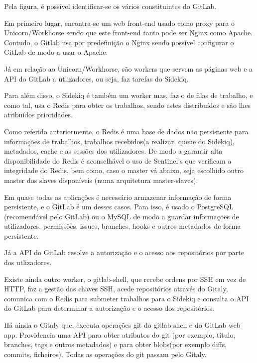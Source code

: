 \documentclass{article}
\begin{document}
Pela figura, é possível identificar-se os vários constituintes do GitLab.~\cite{arch}

Em primeiro lugar, encontra-se um web front-end usado como proxy para o Unicorn/Workhorse sendo que este front-end tanto pode ser Nginx como Apache. Contudo, o Gitlab usa por predefinição o Nginx sendo possível configurar o GitLab de modo a usar o Apache.~\cite{apache} 

Já em relação ao Unicorn/Workhorse, são workers que servem as páginas web e a API do GitLab a utlizadores, ou seja, faz tarefas do Sidekiq.

Para além disso, o Sidekiq é também um worker mas, faz o  de filas de trabalho, e como tal, usa o Redis para obter os trabalhos, sendo estes distribuídos e são lhes atribuídos prioridades.

Como referido anteriormente, o Redis é uma base de dados não persistente para informações de trabalhos, trabalhos recebidos(a realizar, queue do Sidekiq), metadados, cache e as sessões dos utilizadores. De modo a garantir alta disponibilidade do Redis é aconselhável o uso de Sentinel's que verificam a integridade do Redis, bem como, caso o master vá abaixo, seja escolhido outro master dos slaves disponíveis (numa arquitetura master-slaves).

Em quase todas as aplicações é necessário armazenar informação de forma persistente, e o GitLab é um desses casos. Para isso, é usado o PostgreSQL (recomendável pelo GitLab) ou o MySQL de modo a guardar informações de utilizadores, permissões, issues, branches, hooks e outros metadados de forma persistente.

Já a API do GitLab resolve a autorização e o acesso aos repositórios por parte dos utlizadores.

Existe ainda outro worker, o gitlab-shell, que recebe ordens por SSH em vez de HTTP, faz a gestão das chaves SSH, acede repositórios através do Gitaly, comunica com o Redis para submeter trabalhos para o Sidekiq e consulta o API do GitLab para determinar a autorização e o acesso dos repositórios.

Há ainda o Gitaly que, executa operações git do gitlab-shell e do GitLab web app. Providencia uma API para obter atributos do git (por exemplo, título, branches, tags e outros metadados) e para obter blobs(por exemplo diffs, commits, ficheiros). Todas as operações do git passam pelo Gitaly.
\end{document}
